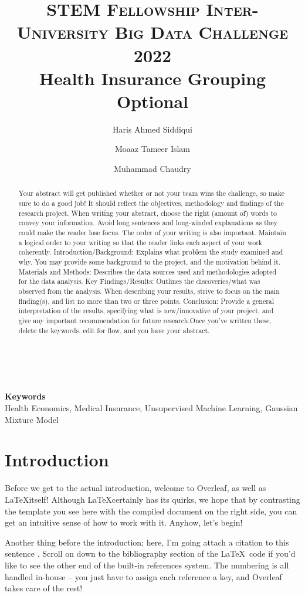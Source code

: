 \documentclass[12pt,twocolumn,letterpaper]{article}
\title{
		\usefont{OT1}{bch}{b}{n}
		\normalfont \normalsize \textsc{STEM Fellowship Inter-University Big Data Challenge 2022} \\ [10pt]
		\huge Health Insurance Grouping \\ %
		\normalsize Optional  \\
}
\author[1]{Haris Ahmed Siddiqui}
\author[2]{Moaaz Tameer Islam}
\author[3]{Muhammad Chaudry}
\affil[1]{Arizona State University}
\affil[2]{National University of Sciences \& Technology}
\affil[3]{Anglia Ruskin University}
\begin{document}
\maketitle

\tableofcontents%

\begin{abstract}
Your abstract will get published whether or not your team wins the challenge, so make sure to do a good job! It should reflect the objectives, methodology and findings of the research project. When writing your abstract, choose the right (amount of) words to convey your information. Avoid long sentences and long-winded explanations as they could make the reader lose focus. The order of your writing is also important. Maintain a logical order to your writing so that the reader links each aspect of your work coherently. Introduction/Background: Explains what problem the study examined and why. You may provide some background to the project, and the motivation behind it. Materials and Methods: Describes the data sources used and methodologies adopted for the data analysis. Key Findings/Results: Outlines the discoveries/what was observed from the analysis. When describing your results, strive to focus on the main finding(s), and list no more than two or three points. Conclusion: Provide a general interpretation of the results, specifying what is new/innovative of your project, and give any important recommendation for future research.Once you've written these, delete the keywords, edit for flow, and you have your abstract.
\end{abstract} \\ 
\\ 
{\textbf{Keywords} \\
Health Economics, Medical Insurance, Unsupervised Machine Learning, Gaussian Mixture Model}

\section{Introduction}
Before we get to the actual introduction, welcome to Overleaf, as well as \LaTeX itself! Although \LaTeX certainly has its quirks, we hope that by contrasting the template you see here with the compiled document on the right side, you can get an intuitive sense of how to work with it. Anyhow, let's begin!

Another thing before the introduction; here, I'm going attach a citation to this sentence \cite{ReferenceName}. Scroll on down to the bibliography section of the \LaTeX\ code if you'd like to see the other end of the built-in references system. The numbering is all handled in-house -- you just have to assign each reference a key, and Overleaf takes care of the rest!
\end{document}

